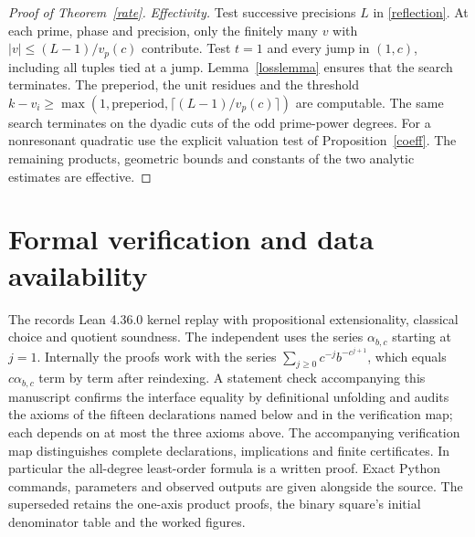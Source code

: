\documentclass[11pt]{article}
\begin{document}
\begin{proof}[Proof of Theorem~\ref{rate}]
\emph{Effectivity.} Test successive precisions \(L\) in
\eqref{reflection}. At each prime, phase and precision, only the
finitely many \(v\) with \(|v|\le(L-1)/v_p(c)\) contribute. Test \(t=1\)
and every jump in \((1,c)\), including all tuples tied at a jump.
Lemma~\ref{losslemma} ensures that the search terminates. The preperiod,
the unit residues and the threshold
\(k-v_i\ge\max(1,\text{preperiod},\lceil(L-1)/v_p(c)\rceil)\)
are computable. The same search terminates on the dyadic cuts of the
odd prime-power degrees. For a nonresonant quadratic use the explicit
valuation test of Proposition~\ref{coeff}. The remaining products,
geometric bounds and constants of the two analytic estimates are
effective.
\end{proof}

\section{Formal verification and data availability}
The  records Lean
4.36.0 kernel replay with propositional extensionality, classical choice
and quotient soundness. The independent
 uses the series
\(\alpha_{b,c}\) starting at \(j=1\). Internally the proofs work with the
series \(\sum_{j\ge0}c^{-j}b^{-c^{j+1}}\), which equals \(c\alpha_{b,c}\)
term by term after reindexing. A statement check accompanying this
manuscript confirms the interface equality by definitional unfolding and
audits the axioms of the fifteen declarations named below and in the
verification map; each depends on at most the three axioms above.
The accompanying verification map distinguishes complete declarations,
implications and finite certificates. In particular the all-degree
least-order formula is a written proof. Exact Python commands, parameters
and observed outputs are given alongside the source. The superseded
 retains the one-axis
product proofs, the binary square's initial denominator table and the
worked figures.
\end{document}
